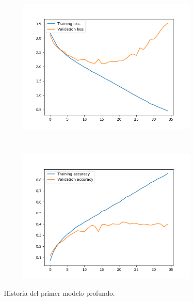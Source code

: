 \documentclass[11pt,a4paper]{article}
\begin{document}
\begin{figure}[H]
  \centering
  \begin{subfigure}{.5\textwidth}
    \includegraphics[scale=0.4]{img/deep1-nodrop-loss.png}
    \label{fig:deep1-nodrop-loss}
  \end{subfigure}%
  ~ \quad
  \begin{subfigure}{.5\textwidth}
    \includegraphics[scale=0.4]{img/deep1-nodrop-acc.png}
    \label{fig:deep1-nodrop-acc}
  \end{subfigure}
  \caption{Historia del primer modelo profundo.}
  \label{fig:history-deep1-nodrop}
\end{figure}
\end{document}
